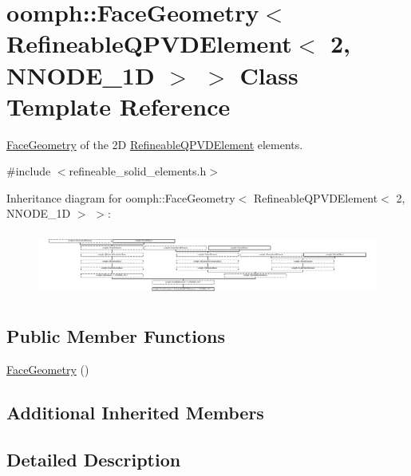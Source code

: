 \hypertarget{classoomph_1_1FaceGeometry_3_01RefineableQPVDElement_3_012_00_01NNODE__1D_01_4_01_4}{}\section{oomph\+:\+:Face\+Geometry$<$ Refineable\+Q\+P\+V\+D\+Element$<$ 2, N\+N\+O\+D\+E\+\_\+1D $>$ $>$ Class Template Reference}
\label{classoomph_1_1FaceGeometry_3_01RefineableQPVDElement_3_012_00_01NNODE__1D_01_4_01_4}


\hyperlink{classoomph_1_1FaceGeometry}{Face\+Geometry} of the 2D \hyperlink{classoomph_1_1RefineableQPVDElement}{Refineable\+Q\+P\+V\+D\+Element} elements.  




{\ttfamily \#include $<$refineable\+\_\+solid\+\_\+elements.\+h$>$}

Inheritance diagram for oomph\+:\+:Face\+Geometry$<$ Refineable\+Q\+P\+V\+D\+Element$<$ 2, N\+N\+O\+D\+E\+\_\+1D $>$ $>$\+:\begin{figure}[H]
\begin{center}
\leavevmode
\includegraphics[height=2.143541cm]{classoomph_1_1FaceGeometry_3_01RefineableQPVDElement_3_012_00_01NNODE__1D_01_4_01_4}
\end{center}
\end{figure}
\subsection*{Public Member Functions}
\begin{DoxyCompactItemize}
\item 
\hyperlink{classoomph_1_1FaceGeometry_3_01RefineableQPVDElement_3_012_00_01NNODE__1D_01_4_01_4_ac098cc062fe16fcea10168323c364f49}{Face\+Geometry} ()
\end{DoxyCompactItemize}
\subsection*{Additional Inherited Members}


\subsection{Detailed Description}
